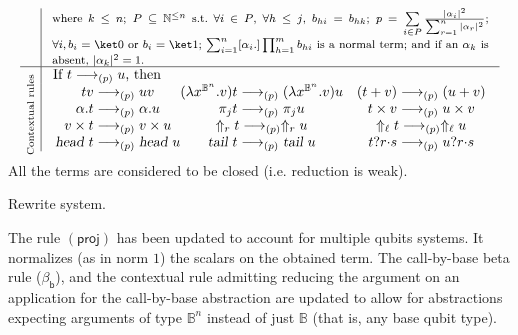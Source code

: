 \documentclass[preprint]{elsarticle}
\newcommand\titulo[3][\scriptsize]{\rotatebox[origin=c]{90}{\parbox[t]{#2}{\centering #1{#3}}}}
\newcommand\lra[1][1]{\longrightarrow_{\left(#1\right)}}
\newcommand\lrap{\lra[p]}
\newcommand\B{\ensuremath{\mathbb B}}
\newcommand\ite[3]{{#1}?{#2}\mathord{\cdot}{#3}}
\newcommand\pair[2]{({#1}+{#2})}
\newcommand\s[1]{\ensuremath{\mathsf{#1}}}
\newcommand\head{\text{\sl head}}
\newcommand\tail{\text{\sl tail}}
\newcommand\may[1][\alpha]{[{#1}.]}
\newcommand\rbetab{(\s{\beta_b})}
\newcommand\rproj{(\s{proj})}
\begin{document}
\begin{table}
{{\[\begin{array}{c|r@{\ }lr}
          &\multicolumn{3}{c}{\parbox{11cm}{\footnotesize where
            $k\leq n$;
            $P\subseteq\mathbb N^{\leq n}$ s.t.~$\forall i\in P$, $\forall h\leq j$, $b_{hi}= b_{hk}$;
            $p=\sum\limits_{i\in P}\frac{|\alpha_i|^2}{\sum_{r=1}^n|\alpha_r|^2}$;
            $\forall i, b_i=\ket 0$ or $b_i=\ket 1$;
            $\sum_{i=1}^n\may[\alpha_i]\prod_{h=1}^mb_{hi}$ is a normal term; and
            if an $\alpha_k$ is absent, $|\alpha_k|^2=1$.
            }}\\\hline
          \multirow{2}{*}{\titulo{24mm}{Contextual rules}}
          &\multicolumn{3}{l}{\textrm{ If $t\lrap u$, then}}\\
          &\multicolumn{3}{c}{
            \begin{array}{c@{}cc}
              tv \lrap uv &
                            (\lambda x^{\B^n}.v)t\lrap(\lambda x^{\B^n}.v)u &
                                                                              \pair tv\lrap\pair uv \\
              \alpha.t\lrap\alpha.u&
                                     \pi_j t\lrap\pi_j u&
                                                          t\times v\lrap u\times v \\
              v\times t\lrap v\times u&
                                        \Uparrow_r t\lrap\Uparrow_r u&
                                                                       \Uparrow_\ell t\lrap\Uparrow_\ell u \\
              \head\ t\lrap\head\ u&
                                     \tail\ t\lrap\tail\ u&
                                                            \ite trs\lrap\ite urs
            \end{array}
          }
        \end{array}
      \]
  \centering
  All the terms are considered to be closed (i.e. reduction is weak).
    }
  }
  \caption{Rewrite system.}
  \label{tab:URS}
\end{table}

The rule $\rproj$ has been updated to account for multiple qubits systems. It
normalizes (as in norm $1$) the scalars on the obtained term. The call-by-base
beta rule \rbetab, and the contextual rule admitting reducing the argument on an
application for the call-by-base abstraction are updated to allow for
abstractions expecting arguments of type $\B^n$ instead of just $\B$ (that is, any
base qubit type).
\end{document}
